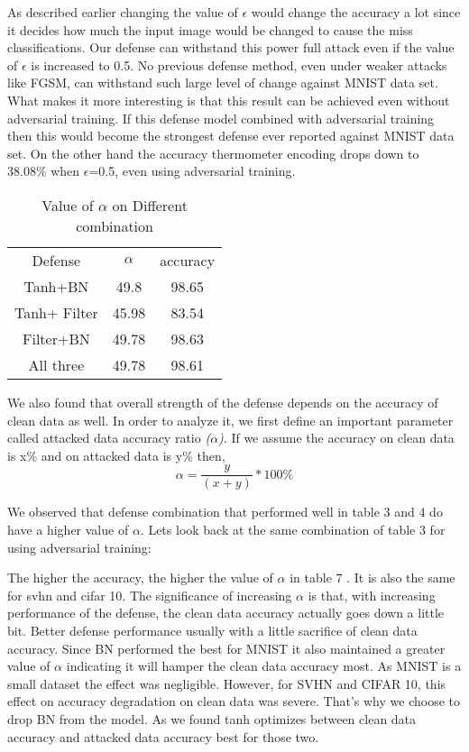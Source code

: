\documentclass[conference]{IEEEtran}
\begin{document}
As described earlier changing the value of $\epsilon$ would change the accuracy a lot since it decides how much the input image would be changed to cause the miss classifications. Our defense can withstand this power full attack even if the value of $\epsilon$ is increased to 0.5. No previous defense method, even under weaker attacks like FGSM, can withstand such large level of change against MNIST data set. What makes it more interesting is that this result can be achieved even without adversarial training. If this defense model combined with adversarial training then this would become the strongest defense ever reported against MNIST data set. On the other hand the accuracy thermometer encoding drops down to 38.08\% when $\epsilon$=0.5, even using adversarial training. 

\begin{table}[h]
\centering
\caption{Value of $\alpha$ on Different combination}
\begin{tabular}{ |c|c|c| } 
 \hline
 Defense & $\alpha$ & accuracy \\ 
 Tanh+BN & 49.8 & 98.65 \\ 
 Tanh+ Filter & 45.98 & 83.54 \\
 Filter+BN & 49.78 & 98.63 \\
 All three & 49.78 & 98.61 \\
 \hline
\end{tabular}
\end{table}

We also found that overall strength of the defense depends on the accuracy of clean data as well. In order to analyze it, we first define an important parameter called attacked data accuracy ratio \textit{($\alpha$)}. If we assume the accuracy on clean data is x\% and on attacked data is y\% then,
\begin{equation}
    \alpha= \frac{y}{(x+y)}*100\%
\end{equation}

We observed that defense combination that performed well in table 3 and 4 do have a higher value of $\alpha$. Lets look back at the same combination of table 3 for using adversarial training:


The higher the accuracy, the higher the value of $\alpha$ in table 7 . It is also the same for svhn and cifar 10. The significance of increasing $\alpha$ is that, with increasing performance of the defense, the clean data accuracy actually goes down a little bit. Better defense performance usually with a little sacrifice of clean data accuracy. Since BN performed the best for MNIST it also maintained a greater value of $\alpha$ indicating it will hamper the clean data accuracy most. As MNIST is a small dataset the effect was negligible. However, for SVHN and CIFAR 10, this effect on accuracy degradation on clean data was severe. That's why we choose to drop BN from the model. As we found tanh optimizes between clean data accuracy and attacked data accuracy best for those two.
\end{document}
